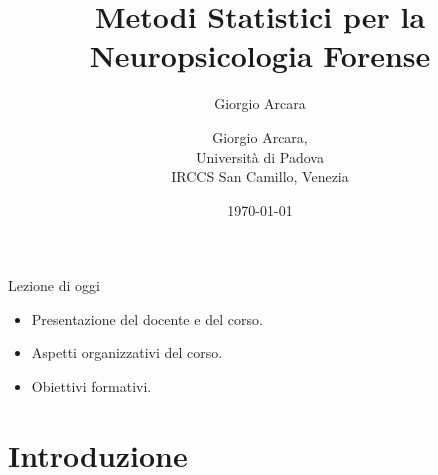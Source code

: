 \documentclass[
  ignorenonframetext,
]{beamer}
\author{Giorgio Arcara}
\date{}
\providecommand{\tightlist}{%
  \setlength{\itemsep}{0pt}\setlength{\parskip}{0pt}}
\begin{document}
\begin{frame}
\title{Metodi Statistici per la Neuropsicologia Forense}
\author{Giorgio Arcara,\\ Università di Padova \\ IRCCS San Camillo, Venezia}

\date{\today}
\maketitle
\end{frame}

\begin{frame}{Lezione di oggi}
\label{lezione-di-oggi}
\begin{itemize}[<+->]
\tightlist
\item
  Presentazione del docente e del corso.
\item
  Aspetti organizzativi del corso.
\item
  Obiettivi formativi.
\end{itemize}
\end{frame}

\section{Introduzione}\label{introduzione}
\end{document}
